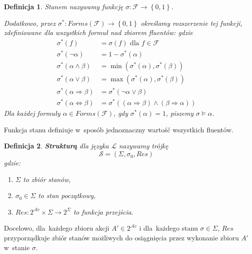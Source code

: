 \documentclass[11pt,a4paper]{article}
\newtheorem{defn}{Definicja}
\begin{document}
\begin{defn}
    Stanem nazywamy funkcję $\sigma : \mathcal{F} \rightarrow \left\{0,1\right\}$.

    Dodatkowo, przez $\sigma^{*} : Forms(\mathcal{F}) \rightarrow \left\{0,1\right\}$ określamy rozszerzenie tej funkcji, zdefiniowane dla wszystkich formuł nad zbiorem fluentów:
    gdzie
    \begin{align*}
        \sigma^{*}\left(f\right) &= \sigma\left(f\right) \text{ dla } f \in \mathcal{F} \\
        \sigma^{*}\left(\neg \alpha\right) &= 1 - \sigma^{*}\left(\alpha\right) \\
        \sigma^{*}\left(\alpha \land \beta\right) &= \min \left(\sigma^{*}\left(\alpha\right),\sigma^{*}\left(\beta\right)\right) \\
        \sigma^{*}\left(\alpha \lor \beta\right) &= \max \left(\sigma^{*}\left(\alpha\right),\sigma^{*}\left(\beta\right)\right) \\
        \sigma^{*}\left(\alpha \Rightarrow \beta\right) &= \sigma^{*}\left(\neg \alpha \lor \beta\right) \\
        \sigma^{*}\left(\alpha \Leftrightarrow \beta\right) &= \sigma^{*}\left(\left(\alpha \Rightarrow \beta\right)\land\left(\beta \Rightarrow \alpha\right)\right)
    \end{align*}
    Dla każdej formuły $\alpha \in Forms\left(\mathcal{F}\right)$, gdy $\sigma^*\left(\alpha\right) = 1$, piszemy $\sigma \models \alpha$.
\end{defn}

Funkcja stanu definiuje w~sposób jednoznaczny wartość wszystkich fluentów.

\begin{defn}
    \textbf{Strukturą} dla języka $\mathcal{L}$ nazywamy trójkę
    $$\mathcal{S} = \left(\Sigma, \sigma_0, Res\right)$$
    gdzie:
    \begin{enumerate}
        \item $\Sigma$ to zbiór stanów,
        \item $\sigma_0 \in \Sigma$ to stan początkowy,
        \item $Res : 2^{\mathcal{A}c} \times \Sigma \rightarrow 2^\Sigma$ to funkcja przejścia.
    \end{enumerate}
\end{defn}

Docelowo, dla~każdego zbioru akcji $A' \in 2^{\mathcal{A}c}$ i dla~każdego stanu $\sigma \in \Sigma$, $Res$ przyporządkuje zbiór stanów możliwych do osiągnięcia przez wykonanie zbioru $A'$ w~stanie $\sigma$.
\end{document}
